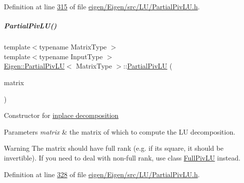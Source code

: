 Definition at line \hyperlink{eigen_2_eigen_2src_2_l_u_2_partial_piv_l_u_8h_source_l00315}{315} of file \hyperlink{eigen_2_eigen_2src_2_l_u_2_partial_piv_l_u_8h_source}{eigen/\+Eigen/src/\+L\+U/\+Partial\+Piv\+L\+U.\+h}.

\mbox{\label{group___l_u___module_a4efc917d31d0e9d76781a97509309061}} 
\subparagraph{\texorpdfstring{Partial\+Piv\+L\+U()}{PartialPivLU()}\hspace{0.1cm}{\footnotesize\ttfamily [4/8]}}
{\footnotesize\ttfamily template$<$typename Matrix\+Type $>$ \\
template$<$typename Input\+Type $>$ \\
\hyperlink{group___l_u___module_class_eigen_1_1_partial_piv_l_u}{Eigen\+::\+Partial\+Piv\+LU}$<$ Matrix\+Type $>$\+::\hyperlink{group___l_u___module_class_eigen_1_1_partial_piv_l_u}{Partial\+Piv\+LU} (\begin{DoxyParamCaption}\item[{\hyperlink{group___core___module_struct_eigen_1_1_eigen_base}{Eigen\+Base}$<$ Input\+Type $>$ \&}]{matrix }\end{DoxyParamCaption})\hspace{0.3cm}{\ttfamily [explicit]}}

Constructor for \hyperlink{group___inplace_decomposition}{inplace decomposition }


\begin{DoxyParams}{Parameters}
{\em matrix} & the matrix of which to compute the LU decomposition.\\
\hline
\end{DoxyParams}
\begin{DoxyWarning}{Warning}
The matrix should have full rank (e.\+g. if it\textquotesingle{}s square, it should be invertible). If you need to deal with non-\/full rank, use class \hyperlink{group___l_u___module_class_eigen_1_1_full_piv_l_u}{Full\+Piv\+LU} instead. 
\end{DoxyWarning}


Definition at line \hyperlink{eigen_2_eigen_2src_2_l_u_2_partial_piv_l_u_8h_source_l00328}{328} of file \hyperlink{eigen_2_eigen_2src_2_l_u_2_partial_piv_l_u_8h_source}{eigen/\+Eigen/src/\+L\+U/\+Partial\+Piv\+L\+U.\+h}.

